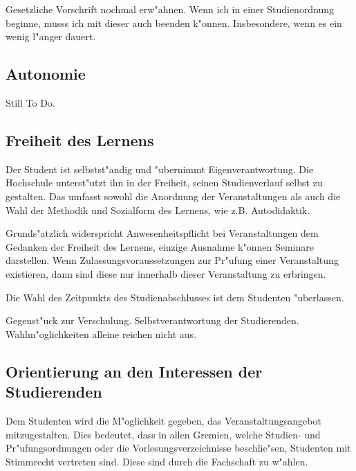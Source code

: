 \begin{kcmt}\begin{komacmt}
	Gesetzliche Vorschrift nochmal erw"ahnen. Wenn ich in einer Studienordnung 
	beginne, musss ich mit dieser auch beenden k"onnen. Insbesondere, wenn es ein wenig l"anger dauert.
\end{komacmt}\end{kcmt}

\begin{stilltodo}
\subsection{Autonomie}

{\Large{Still To Do.}}
\end{stilltodo}

\subsection{Freiheit des Lernens}

Der Student ist selbstst"andig und "ubernimmt Eigenverantwortung. Die Hochschule
unterst"utzt ihn in der Freiheit, seinen Studienverlauf selbst zu gestalten.
Das umfasst sowohl die Anordnung der Veranstaltungen als auch die Wahl der Methodik
und Sozialform des Lernens, wie z.B. Autodidaktik.

Grunds"atzlich widerspricht Anwesenheitspflicht bei Veranstaltungen dem Gedanken
der Freiheit des Lernens, einzige Ausnahme k"onnen Seminare darstellen. Wenn Zulassungsvoraussetzungen
zur Pr"ufung einer Veranstaltung existieren, dann sind diese nur innerhalb dieser
Veranstaltung zu erbringen.

Die Wahl des Zeitpunkts des Studienabschlusses ist dem Studenten "uberlassen.

\begin{kcmt}\begin{komacmt}
	Gegenst"uck zur Verschulung. Selbstverantwortung der Studierenden. Wahlm"oglichkeiten alleine reichen nicht aus.
\end{komacmt}\end{kcmt}

\subsection{Orientierung an den Interessen der Studierenden}
Dem Studenten wird die M"oglichkeit gegeben, das Veranstaltungsangebot mitzugestalten. 
Dies bedeutet, dass in allen Gremien, welche Studien- und Pr"ufungsordnungen oder die 
Vorlesungsverzeichnisse beschlie"sen, Studenten mit Stimmrecht vertreten sind. Diese sind
durch die Fachschaft zu w"ahlen.

